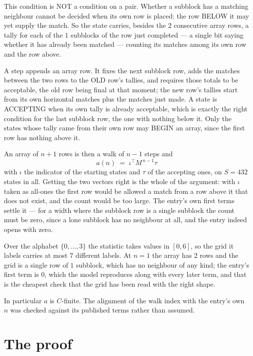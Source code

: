\documentclass[11pt,a4paper]{article}
\theoremstyle{plain}
\theoremstyle{definition}
\begin{document}
This condition is NOT a condition on a pair. Whether a subblock has a
matching neighbour cannot be decided when its own row is placed: the row BELOW it may yet
supply the match. So the state carries, besides the $2$ consecutive array rows, a tally for
each of the $1$ subblocks of the row just completed --- a single bit saying whether it has already been matched --- counting its matches
among its own row and the row above.

A step appends an array row. It fixes the next subblock row, adds the matches between the two
rows to the OLD row's tallies, and requires those totals to be acceptable, the old row being
final at that moment; the new row's tallies start from its own horizontal matches plus the
matches just made. A state is ACCEPTING when its own tally is already acceptable, which is
exactly the right condition for the last subblock row, the one with nothing below it. Only the
states whose tally came from their own row may BEGIN an array, since the first row has nothing
above it.

An array of $n+1$ rows is then a walk of $n-1$ steps and
\[
a(n)\;=\;\iota^{\!\top}M^{\,n-1}\tau
\]
with $\iota$ the indicator of the starting states and $\tau$ of the accepting ones, on
$S=432$ states in all. Getting the two vectors right is the whole of the argument: with
$\iota$ taken as all-ones the first row would be allowed a match from a row above it that does
not exist, and the count would be too large. The entry's own first terms settle it --- for
a width where the subblock row is a single subblock
the count must be zero, since a lone subblock has no neighbour at all, and the entry indeed opens with zero.

Over the alphabet $\{0,\dots,3\}$ the statistic takes values in $[0,6]$, so the
grid it labels carries at most $7$ different labels. At $n=1$ the array has $2$
rows and the grid is a single row of $1$
subblock, which has no neighbour of any kind; the entry's first term is
$0$, which the model reproduces along with every later term, and that is the cheapest
check that the grid has been read with the right shape.

In particular $a$ is $C$-finite. The alignment of the walk index with the entry's own $n$ was
checked against its published terms rather than assumed.

\section{The proof}
\end{document}
